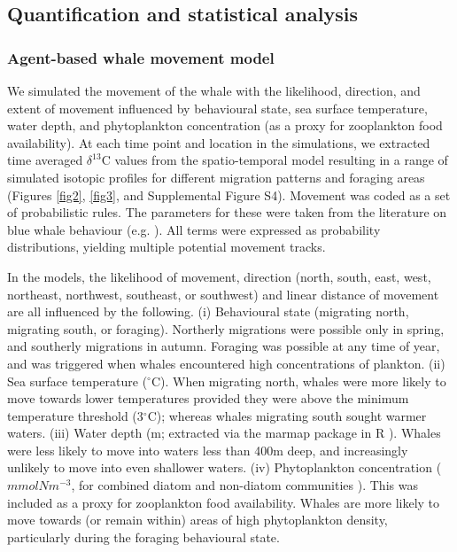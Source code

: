 \documentclass[a4paper,12pt]{article}
\begin{document}
\subsection{Quantification and statistical analysis}
\subsubsection{Agent-based whale movement model}
We simulated the movement of the whale with the likelihood, direction, and extent of movement influenced by behavioural state, sea surface temperature, water depth, and phytoplankton concentration (as a proxy for zooplankton food availability). 
At each time point and location in the simulations, we extracted time averaged $\delta^{13}$C values from the spatio-temporal model \cite{magozzi2017using} resulting in a range of simulated isotopic profiles for different migration patterns and foraging areas (Figures \ref{fig2}, \ref{fig3}, and Supplemental Figure S4). 
Movement was coded as a set of probabilistic rules. 
The parameters for these were taken from the literature on blue whale behaviour (e.g. \cite{handbook}). 
All terms were expressed as probability distributions, yielding multiple potential movement tracks. 
 
In the models, the likelihood of movement, direction (north, south, east, west, northeast, northwest, southeast, or southwest) and linear distance of movement are all influenced by the following. 
(i) Behavioural state (migrating north, migrating south, or foraging).
Northerly migrations were possible only in spring, and southerly migrations in autumn. 
Foraging was possible at any time of year, and was triggered when whales encountered high concentrations of plankton.
(ii) Sea surface temperature \cite{yool2013medusa} ($^{\circ}$C). 
When migrating north, whales were more likely to move towards lower temperatures provided they were above the minimum temperature threshold (3$^{\circ}$C); whereas whales migrating south sought warmer waters. 
(iii) Water depth \cite{bathy} (m; extracted via the marmap package in R \cite{marmap}). 
Whales were less likely to move into waters less than 400m deep, and increasingly unlikely to move into even shallower waters. 
(iv) Phytoplankton concentration ($mmolNm^{-3}$, for combined diatom and non-diatom communities \cite{yool2013medusa}). 
This was included as a proxy for zooplankton food availability. 
Whales are more likely to move towards (or remain within) areas of high phytoplankton density, particularly during the foraging behavioural state. 
\end{document}
